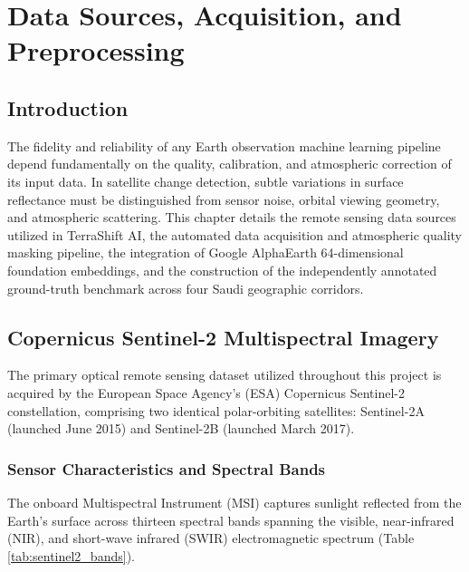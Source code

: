 \chapter{Data Sources, Acquisition, and Preprocessing}
\label{ch:data}

\section{Introduction}
\label{sec:data_intro}
The fidelity and reliability of any Earth observation machine learning pipeline depend fundamentally on the quality, calibration, and atmospheric correction of its input data. In satellite change detection, subtle variations in surface reflectance must be distinguished from sensor noise, orbital viewing geometry, and atmospheric scattering. This chapter details the remote sensing data sources utilized in TerraShift AI, the automated data acquisition and atmospheric quality masking pipeline, the integration of Google AlphaEarth 64-dimensional foundation embeddings, and the construction of the independently annotated ground-truth benchmark across four Saudi geographic corridors.

\section{Copernicus Sentinel-2 Multispectral Imagery}
\label{sec:data_sentinel2}
The primary optical remote sensing dataset utilized throughout this project is acquired by the European Space Agency's (ESA) Copernicus Sentinel-2 constellation, comprising two identical polar-orbiting satellites: Sentinel-2A (launched June 2015) and Sentinel-2B (launched March 2017).

\subsection{Sensor Characteristics and Spectral Bands}
The onboard Multispectral Instrument (MSI) captures sunlight reflected from the Earth's surface across thirteen spectral bands spanning the visible, near-infrared (NIR), and short-wave infrared (SWIR) electromagnetic spectrum (Table \ref{tab:sentinel2_bands}).

